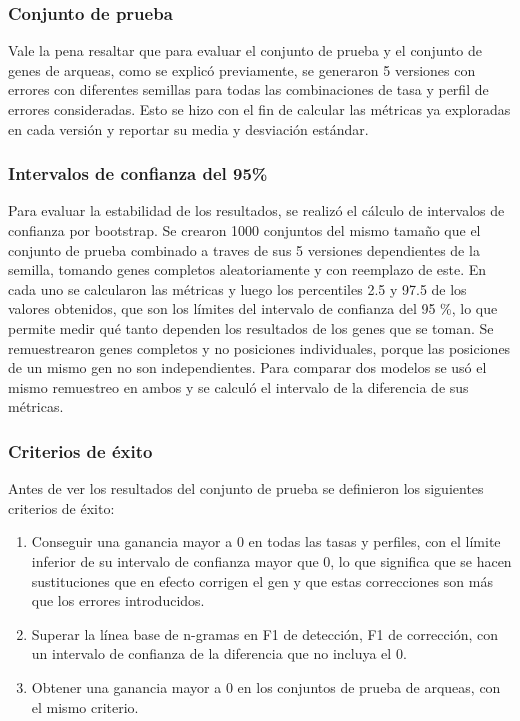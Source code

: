 \documentclass[sigconf,nonacm]{acmart}
\begin{document}
\subsubsection{Conjunto de prueba}\label{sec:conjunto-prueba}

Vale la pena resaltar que para evaluar el conjunto de prueba y el conjunto de genes de arqueas, como se explicó previamente, se generaron 5 versiones con errores con diferentes semillas para todas las combinaciones de tasa y perfil de errores consideradas. Esto se hizo con el fin de calcular las métricas ya exploradas en cada versión y reportar su media y desviación estándar.

\subsubsection{Intervalos de confianza del 95\%}\label{sec:intervalos}

Para evaluar la estabilidad de los resultados, se realizó el cálculo de intervalos de confianza por bootstrap. Se crearon 1000 conjuntos del mismo tamaño que el conjunto de prueba combinado a traves de sus 5 versiones dependientes de la semilla, tomando genes completos aleatoriamente y con reemplazo de este. En cada uno se calcularon las métricas y luego los percentiles 2.5 y 97.5 de los valores obtenidos, que son los límites del intervalo de confianza del 95 \%, lo que permite medir qué tanto dependen los resultados de los genes que se toman. Se remuestrearon genes completos y no posiciones individuales, porque las posiciones de un mismo gen no son independientes. Para comparar dos modelos se usó el mismo remuestreo en ambos y se calculó el intervalo de la diferencia de sus métricas.

\subsubsection{Criterios de éxito}\label{sec:criterios}

Antes de ver los resultados del conjunto de prueba se definieron los siguientes criterios de éxito:

\begin{enumerate}
\renewcommand{\labelenumi}{\alph{enumi}.}

\item Conseguir una ganancia mayor a 0 en todas las tasas y perfiles, con el límite inferior de su intervalo de confianza mayor que 0, lo que significa que se hacen sustituciones que en efecto corrigen el gen y que estas correcciones son más que los errores introducidos.

\item Superar la línea base de n-gramas en F1 de detección, F1 de corrección, con un intervalo de confianza de la diferencia que no incluya el 0.

\item Obtener una ganancia mayor a 0 en los conjuntos de prueba de arqueas, con el mismo criterio.

\end{enumerate}
\end{document}
